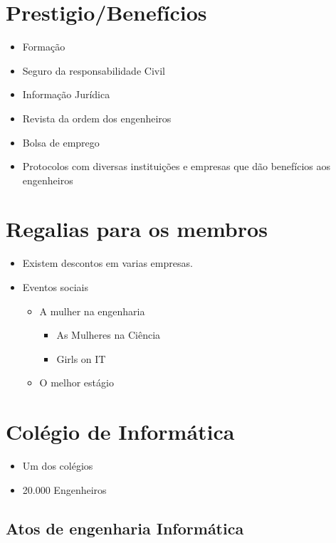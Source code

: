 \section{Prestigio/Benefícios}
\begin{itemize}
    \item Formação
    \item Seguro da responsabilidade Civil
    \item Informação Jurídica
    \item Revista da ordem dos engenheiros
    \item Bolsa de emprego
    \item Protocolos com diversas instituições e empresas que dão benefícios aos engenheiros
\end{itemize}

\section{Regalias para os membros}

\begin{itemize}
    \item Existem descontos em varias empresas.
    \item Eventos sociais
        \begin{itemize}
            \item A mulher na engenharia
            \begin{itemize}
                \item As Mulheres na Ciência
                \item Girls on IT
            \end{itemize}
            \item O melhor estágio
        \end{itemize}
\end{itemize}

\section{Colégio de Informática}
\begin{itemize}
    \item Um dos colégios
    \item 20.000 Engenheiros
\end{itemize}





\subsection{Atos de engenharia Informática}

